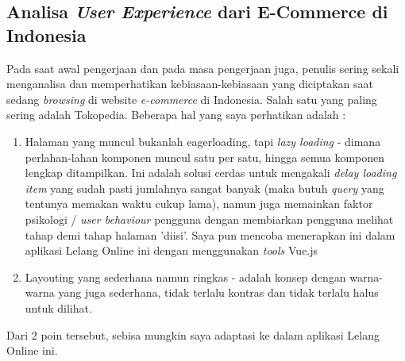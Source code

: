  
	\subsection{Analisa \textit{User Experience} dari E-Commerce di Indonesia}
    \label{alasan-ux-ecommerce-indonesia alasan-app-serupa}
    Pada saat awal pengerjaan dan pada masa pengerjaan juga, penulis sering sekali menganalisa dan memperhatikan kebiasaan-kebiasaan yang diciptakan saat sedang \textit{browsing} di website \textit{e-commerce} di Indonesia. Salah satu yang paling sering adalah Tokopedia.
    Beberapa hal yang saya perhatikan adalah :
    \begin{enumerate}
    \item Halaman yang muncul bukanlah eagerloading, tapi \textit{lazy loading} - dimana perlahan-lahan komponen muncul satu per satu, hingga semua komponen lengkap ditampilkan.
    \linebreak
    Ini adalah solusi cerdas untuk mengakali \textit{delay loading item} yang sudah pasti jumlahnya sangat banyak (maka butuh \textit{query} yang tentunya memakan waktu cukup lama), namun juga memainkan faktor psikologi / \textit{user behaviour} pengguna dengan membiarkan pengguna melihat tahap demi tahap halaman 'diisi'.
    \linebreak
    Saya pun mencoba menerapkan ini dalam aplikasi Lelang Online ini dengan menggunakan \textit{tools} Vue.js
    \item Layouting yang sederhana namun ringkas - adalah konsep dengan warna-warna yang juga sederhana, tidak terlalu kontras dan tidak terlalu halus untuk dilihat.
    \end{enumerate}
    Dari 2 poin tersebut, sebisa mungkin saya adaptasi ke dalam aplikasi Lelang Online ini.
    
